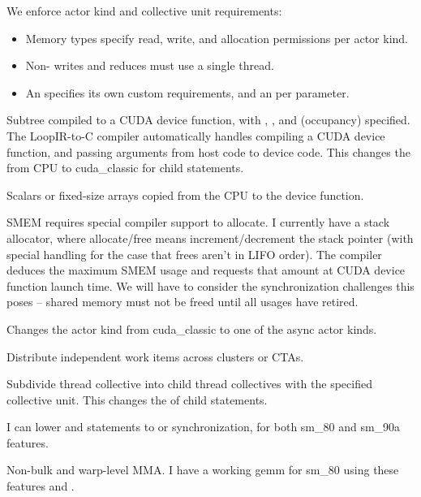 \filbreak
We enforce actor kind and collective unit requirements:
\begin{itemize}
  \item Memory types specify read, write, and allocation permissions per actor kind.
  \item Non- writes and reduces must use a single thread.
  \item An  specifies its own custom requirements, and an  per parameter.
\end{itemize}

\filbreak
{} Subtree compiled to a CUDA device function, with , , and  (occupancy) specified.
The LoopIR-to-C compiler automatically handles compiling a CUDA device function, and passing arguments from host code to device code.
This changes the  from CPU to cuda\_classic for child statements.

\filbreak
{} Scalars or fixed-size arrays copied from the CPU to the device function.

\filbreak
{} SMEM requires special compiler support to allocate.
I currently have a stack allocator, where allocate/free means increment/decrement the stack pointer (with special handling for the case that frees aren't in LIFO order).
The compiler deduces the maximum SMEM usage and requests that amount at CUDA device function launch time.
We will have to consider the synchronization challenges this poses -- shared memory must not be freed until all usages have retired.

\filbreak
{} Changes the actor kind from cuda\_classic to one of the async actor kinds.

\filbreak
{} Distribute independent work items across clusters or CTAs.

\filbreak
{} Subdivide thread collective into child thread collectives with the specified collective unit.
This changes the  of child statements.

\filbreak
{} I can lower  and  statements to  or  synchronization, for both sm\_80 and sm\_90a features.

\filbreak
{} Non-bulk  and warp-level MMA.
I have a working gemm for sm\_80 using these features and .

